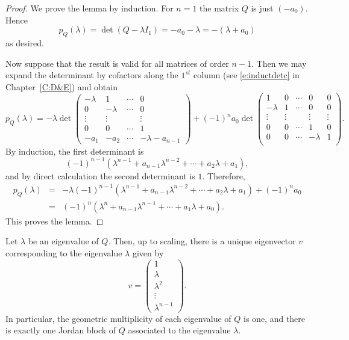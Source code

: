 \documentclass{ximera}
\begin{document}
\begin{proof} We prove the lemma by induction.
For $n=1$ the matrix $Q$ is just $(-a_0)$.  Hence
\[
p_Q(\lambda)=\det(Q-\lambda I_1) = -a_0-\lambda = -(\lambda+a_0)
\]
as desired.

Now suppose that the result is valid for all matrices of order $n-1$.  
Then we may expand the determinant by cofactors
 along the $1^{st}$ column (see \eqref{e:inductdetc} in 
Chapter~\ref{C:D&E}) and obtain 
{\small 
\[
p_Q(\lambda)  =  -\lambda \det\left(\begin{array}{cccc}
-\lambda & 1 &  \cdots & 0\\
0 & -\lambda &  \cdots & 0\\
\vdots & \vdots & & \vdots\\
0 & 0 & \cdots & 1\\
-a_1 & -a_2 & \cdots & -\lambda-a_{n-1}
\end{array}\right)
+(-1)^na_0\det\left(\begin{array}{ccccc}
1 & 0  & \cdots & 0 & 0\\
-\lambda &   1  & \cdots & 0 & 0\\
\vdots & \vdots & & \vdots & \vdots \\
0 & 0 & \cdots &  1  & 0\\
0 & 0 & \cdots & -\lambda & 1\\
\end{array}\right).
\]
}
By induction, the first determinant is 
\[
(-1)^{n-1}(\lambda^{n-1}+a_{n-1}\lambda^{n-2}+
\cdots+a_2\lambda+a_1),
\]
and by direct calculation the second determinant is $1$.  Therefore,
\begin{eqnarray*}
p_Q(\lambda) & = &
-\lambda (-1)^{n-1}(\lambda^{n-1}+a_{n-1}\lambda^{n-2}+
\cdots+a_2\lambda+a_1) +(-1)^n a_0 \\
& = & (-1)^n(\lambda^n+a_{n-1}\lambda^{n-1}+\cdots+a_1\lambda+a_0).
\end{eqnarray*}
This proves the lemma.   \end{proof}

\begin{lemma}   \label{lem:ho2}
Let $\lambda$ be an eigenvalue of $Q$.  Then, up to scaling, there is a 
unique eigenvector $v$ corresponding to the eigenvalue $\lambda$ given by
\[
v = \left(\begin{array}{c}
1\\
\lambda\\
\lambda^2\\
\vdots\\
\lambda^{n-1}
\end{array}\right).
\]
In particular, the geometric 
multiplicity of each eigenvalue of $Q$ is 
one, and there is exactly one Jordan block 
of $Q$ associated to the eigenvalue $\lambda$.
\end{lemma}
\end{document}
